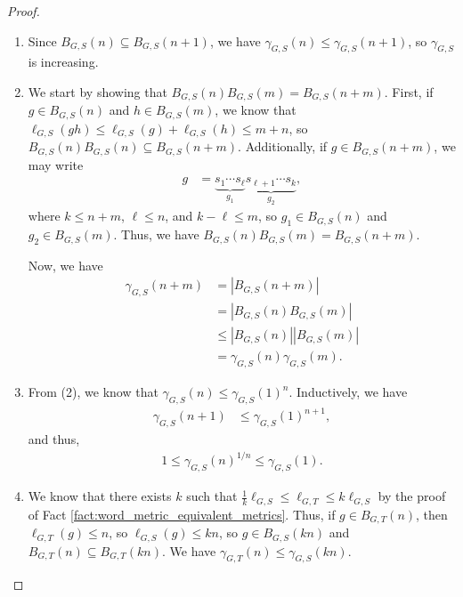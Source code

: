 \documentclass[10pt]{mypackage2}
\begin{document}
\begin{proof}\hfill
  \begin{enumerate}[(1)]
    \item Since $B_{G,S}\left(n\right)\subseteq B_{G,S}\left(n+1\right)$, we have $\gamma_{G,S}\left(n\right) \leq \gamma_{G,S}\left(n+1\right)$, so $\gamma_{G,S}$ is increasing.
    \item We start by showing that $B_{G,S}\left(n\right)B_{G,S}\left(m\right) = B_{G,S}\left(n+m\right)$. First, if $g\in B_{G,S}\left(n\right)$ and $h\in B_{G,S}\left(m\right)$, we know that $\ell_{G,S}\left(gh\right) \leq \ell_{G,S}\left(g\right) + \ell_{G,S}\left(h\right)\leq m+n$, so $B_{G,S}\left(n\right)B_{G,S}\left(n\right) \subseteq B_{G,S}\left(n+m\right)$. Additionally, if $g\in B_{G,S}\left(n+m\right)$, we may write
      \begin{align*}
        g &= \underbrace{s_{1}\cdots s_{\ell}}_{g_1}\underbrace{s_{\ell+1}\cdots s_{k}}_{g_2},
      \end{align*}
      where $k\leq n+m$, $\ell \leq n$, and $k-\ell \leq m$, so $g_1\in B_{G,S}\left(n\right)$ and $g_2\in B_{G,S}\left(m\right)$. Thus, we have $B_{G,S}\left(n\right)B_{G,S}\left(m\right) = B_{G,S}\left(n+m\right)$.\newline

      Now, we have
      \begin{align*}
        \gamma_{G,S}\left(n+m\right) &= \left\vert B_{G,S}\left(n+m\right) \right\vert\\
                                     &= \left\vert B_{G,S}\left(n\right)B_{G,S}\left(m\right) \right\vert\\
                                     &\leq \left\vert B_{G,S}\left(n\right) \right\vert\left\vert B_{G,S}\left(m\right) \right\vert\\
                                     &= \gamma_{G,S}\left(n\right)\gamma_{G,S}\left(m\right).
      \end{align*}
    \item From (2), we know that $\gamma_{G,S}\left(n\right) \leq \gamma_{G,S}\left(1\right)^{n}$. Inductively, we have
      \begin{align*}
        \gamma_{G,S}\left(n+1\right) &\leq \gamma_{G,S}\left(1\right)^{n+1},
      \end{align*}
      and thus,
      \begin{align*}
        1 \leq \gamma_{G,S}\left(n\right)^{1/n}\leq \gamma_{G,S}\left(1\right).
      \end{align*}
    \item We know that there exists $k$ such that $\frac{1}{k}\ell_{G,S} \leq \ell_{G,T}\leq k\ell_{G,S}$ by the proof of Fact \ref{fact:word_metric_equivalent_metrics}. Thus, if $g\in B_{G,T}\left(n\right)$, then $\ell_{G,T}\left(g\right) \leq n$, so $\ell_{G,S}\left(g\right) \leq kn$, so $g\in B_{G,S}\left(kn\right)$ and $B_{G,T}\left(n\right)\subseteq B_{G,T}\left(kn\right)$. We have $\gamma_{G,T}\left(n\right)\leq \gamma_{G,S}\left(kn\right)$.\newline


\end{enumerate}
\end{proof}
\end{document}

